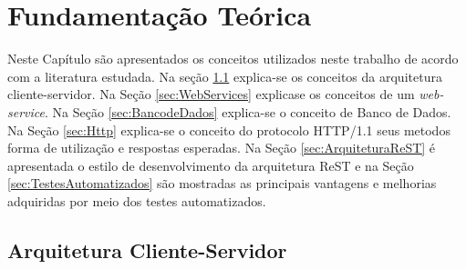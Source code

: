 
\chapter{Fundamentação Teórica}\label{cap:funTeorica}

Neste Capítulo são apresentados os conceitos utilizados neste trabalho de acordo com a literatura estudada. Na seção \ref{sec:ArquiteturaClienteServidor} explica-se os conceitos da arquitetura cliente-servidor. Na Seção \ref{sec:WebServices} explicase os conceitos de um \textit{web-service}. Na Seção \ref{sec:BancodeDados} explica-se o conceito de Banco de Dados. Na Seção \ref{sec:Http} explica-se o conceito do protocolo HTTP/1.1 seus metodos forma de utilização e respostas esperadas. Na Seção \ref{sec:ArquiteturaReST} é apresentada o estilo de desenvolvimento da arquitetura ReST e na Seção \ref{sec:TestesAutomatizados} são mostradas as principais vantagens e melhorias adquiridas por meio dos testes automatizados.


\section{Arquitetura Cliente-Servidor}\label{sec:ArquiteturaClienteServidor}

